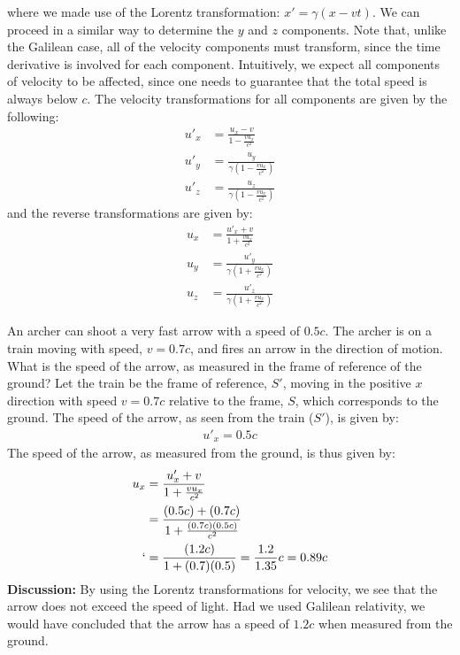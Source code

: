 where we made use of the Lorentz transformation: $x'=\gamma (x-vt)$. We can proceed in a similar way to determine the $y$ and $z$ components. Note that, unlike the Galilean case, all of the velocity components must transform, since the time derivative is involved for each component. Intuitively, we expect all components of velocity to be affected, since one needs to guarantee that the total speed is always below $c$. The velocity transformations for all components are given by the following:
\begin{align*}
u'_x&=\frac{u_x -v}{1- \frac{vu_x}{c^2}}\\
u'_y &=\frac{u_y}{\gamma\left(1- \frac{vu_x}{c^2}\right)}\\
u'_z &=\frac{u_z}{\gamma\left(1- \frac{vu_x}{c^2}\right)}
\end{align*}
and the reverse transformations are given by:
\begin{align*}
u_x &=\frac{u'_x +v}{1+ \frac{vu_x}{c^2}}\\
u_y &=\frac{u'_y}{\gamma\left(1+ \frac{vu_x}{c^2}\right)}\\
u_z &=\frac{u'_z}{\gamma\left(1+ \frac{vu_x}{c^2}\right)}
\end{align*}
\begin{example}{An archer can shoot a very fast arrow with a speed of $0.5c$. The archer is on a train moving with speed, $v=0.7c$, and fires an arrow in the direction of motion. What is the speed of the arrow, as measured in the frame of reference of the ground?}
Let the train be the frame of reference, $S'$, moving in the positive $x$ direction with speed $v=0.7c$ relative to the frame, $S$, which corresponds to the ground. The speed of the arrow, as seen from the train ($S'$), is given by:
\begin{align*}
u'_x = 0.5c
\end{align*}
The speed of the arrow, as measured from the ground, is thus given by:
\begin{align*}
u_x &=\frac{u'_x +v}{1+ \frac{vu_x}{c^2}}\\
&=\frac{(0.5c) +(0.7c)}{1+ \frac{(0.7c)(0.5c)}{c^2}}\\`
&=\frac{(1.2c)}{1+(0.7)(0.5)}=\frac{1.2}{1.35}c=0.89c
\end{align*}
\textbf{Discussion:} By using the Lorentz transformations for velocity, we see that the arrow does not exceed the speed of light. Had we used Galilean relativity, we would have concluded that the arrow has a speed of $1.2c$ when measured from the ground. 
\end{example}

